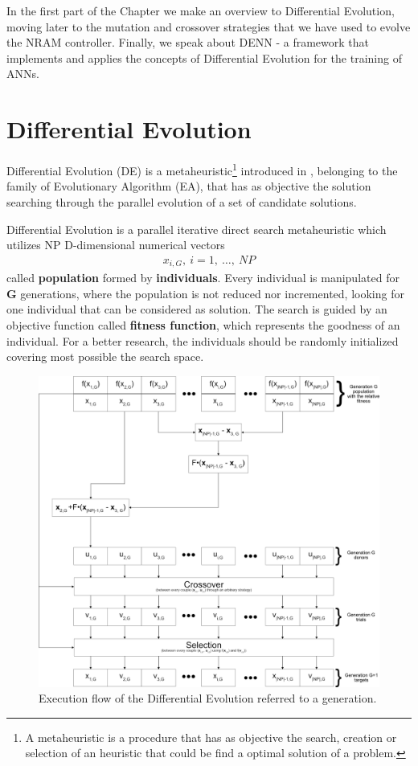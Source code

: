 \label{chap:differential-evolution}
In the first part of the Chapter we make an overview to Differential Evolution, moving later to the mutation and crossover strategies that we have used to evolve the NRAM controller. Finally, we speak about DENN - a framework that implements and applies the concepts of Differential Evolution for the training of ANNs.


\section{Differential Evolution}
Differential Evolution (DE) is a metaheuristic\footnote{A metaheuristic is a procedure that has as objective the search, creation or selection of an heuristic that could be find a optimal solution of a problem.} introduced in \cite{DESEHGOCS:1997}, belonging to the family of Evolutionary Algorithm (EA), that has as objective the solution searching through the parallel evolution of a set of candidate solutions. 

Differential Evolution is a parallel iterative direct search metaheuristic which utilizes NP D-dimensional numerical vectors 
\begin{align}
	x_{i, G},\ i=1,\ \dots,\ NP 
\end{align}
called \textbf{population} formed by \textbf{individuals}. Every individual is manipulated for \textbf{G} generations, where the population is not reduced nor incremented, looking for one individual that can be considered as solution. The search is guided by an objective function called \textbf{fitness function}, which represents the goodness of an individual. For a better research, the individuals should be randomly initialized covering most possible the search space.

\begin{figure}[h]
	\centering
	\includegraphics[width=\textwidth]{figures/de-flow-complete.png}
	\caption{Execution flow of the Differential Evolution referred to a generation.}
	\label{fig:bin-crossover}
\end{figure}


